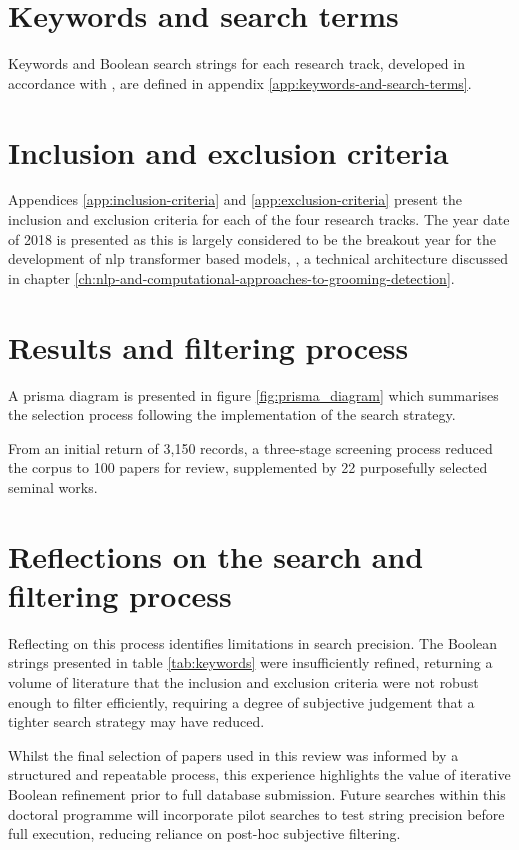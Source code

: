 \documentclass[12pt,a4paper,oneside]{report}
\begin{document}
\section{Keywords and search terms}
\label{sec:keywords-and-search-terms}
Keywords and Boolean search strings for each research track, developed in accordance with \citet{chigbu2023science}, are defined in appendix \ref{app:keywords-and-search-terms}.  

\section{Inclusion and exclusion criteria}
\label{sec:inclusion-and-exclusion-criteria}
Appendices \ref{app:inclusion-criteria} and \ref{app:exclusion-criteria} present the inclusion and exclusion criteria for each of the four research tracks.  The year date of 2018 is presented as this is largely considered to be the breakout year for the development of \gls{nlp} transformer based models, \citep{khanna2024evolution}, a technical architecture discussed in chapter \ref{ch:nlp-and-computational-approaches-to-grooming-detection}. 

\section{Results and filtering process}
\label{sec:results-and-filtering-process}
A \gls{prisma} diagram is presented in figure \ref{fig:prisma_diagram} which summarises the selection process following the implementation of the search strategy. 

From an initial return of 3,150 records, a three-stage screening process reduced the corpus to 100 papers for review, supplemented by 22 purposefully selected seminal works.

\section{Reflections on the search and filtering process}
\label{sec:reflections-on-the-search-and-filtering-process}
Reflecting on this process identifies limitations in search precision.  The Boolean strings presented in table \ref{tab:keywords} were insufficiently refined, returning a volume of literature that the inclusion and exclusion criteria were not robust enough to filter efficiently, requiring a degree of subjective judgement that a tighter search strategy may have reduced.

Whilst the final selection of papers used in this review was informed by a structured and repeatable process, this experience highlights the value of iterative Boolean refinement prior to full database submission. Future 
searches within this doctoral programme will incorporate pilot searches to test string precision before full execution, reducing reliance on post-hoc subjective filtering.
\end{document}
